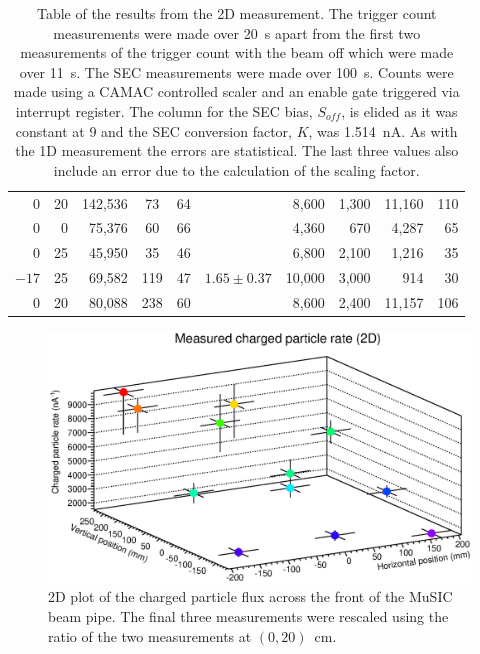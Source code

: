 \begin{table}
\begin{center}
\begin{tabular}{r | r | r | c | c | c | r@{~\(\pm\)~}r | r@{~\(\pm\)~}r}
        0      &   20      &          142,536 & 73                &   64        &          &   8,600  & 1,300  &  11,160 & 110 \\
        0      &    0      &           75,376 & 60                &   66        &          &   4,360  &   670  &   4,287 &  65 \\
      \hline
         0      &   25     &           45,950 & 35                &   46        &   \multirow{3}{*}{\(1.65\pm0.37\)}
                                                                                           &   6,800  &  2,100  &  1,216 &  35 \\
       \(-17\)  &   25     &           69,582 & 119               &   47        &          &  10,000  &  3,000  &    914 &  30 \\
         0      &   20     &           80,088 & 238               &   60        &          &   8,600  &  2,400  & 11,157 & 106 \\
    \end{tabular}
  \end{center}
  \caption{Table of the results from the 2D measurement. The trigger count measurements were made over 20~s apart from the first two measurements of the trigger count with the beam off which were made over 11~s. The SEC measurements were made over 100~s. Counts were made using a CAMAC controlled scaler and an enable gate triggered via interrupt register. The column for the SEC bias, \(S_{off}\), is elided as it was constant at 9 and the SEC conversion factor, \(K\), was 1.514~nA. As with the 1D measurement the errors are statistical. The last three values also include an error due to the calculation of the scaling factor.}
  \label{tab:2d_res}
\end{table}
 
\begin{figure}[hptb]
  \centering
  \includegraphics[width=.8\textwidth]{images/plot_generating_scripts/measured_2d_charged_flux.eps}
  \caption{2D plot of the charged particle flux across the front of the MuSIC beam pipe. The final three measurements were rescaled using the ratio of the two measurements at \((0,20)\)~cm.}
  \label{fig:2D_flux}
\end{figure}
 
